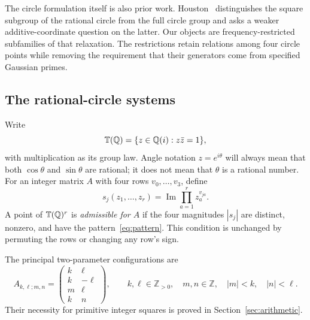 \documentclass[11pt,letterpaper]{article}
\theoremstyle{definition}\newtheorem{definition}[theorem]{Definition}
\theoremstyle{remark}\newtheorem{remark}[theorem]{Remark}
\newcommand{\Q}{\mathbb Q}\newcommand{\Z}{\mathbb Z}\newcommand{\R}{\mathbb R}
\newcommand{\im}{\operatorname{Im}}\newcommand{\Res}{\operatorname{Res}}
\begin{document}
The circle formulation itself is also prior work. Houston~\cite[formulation P4 and question W1]{Houston} distinguishes the square subgroup of the rational circle from the full circle group and asks a weaker additive-coordinate question on the latter. Our objects are frequency-restricted subfamilies of that relaxation. The restrictions retain relations among four circle points while removing the requirement that their generators come from specified Gaussian primes.

\subsection{The rational-circle systems}
Write
\[
 \T(\Q)=\{z\in\Q(i):z\bar z=1\},
\]
with multiplication as its group law. Angle notation $z=e^{i\theta}$ will always mean that both $\cos\theta$ and $\sin\theta$ are rational; it does not mean that $\theta$ is a rational number. For an integer matrix $A$ with four rows $v_0,\ldots,v_3$, define
\[
 s_j(z_1,\ldots,z_r)=\im\prod_{a=1}^r z_a^{v_{ja}}.
\]
A point of $\T(\Q)^r$ is \emph{admissible for $A$} if the four magnitudes $|s_j|$ are distinct, nonzero, and have the pattern~\eqref{eq:pattern}. This condition is unchanged by permuting the rows or changing any row's sign.

The principal two-parameter configurations are
\begin{equation}\label{eq:normalformintro}
 A_{k,\ell;m,n}=
 \begin{pmatrix}k&\ell\\k&-\ell\\m&\ell\\k&n\end{pmatrix},
 \qquad k,\ell\in\Z_{>0},\quad m,n\in\Z,\quad |m|<k,\quad |n|<\ell.
\end{equation}
Their necessity for primitive integer squares is proved in Section~\ref{sec:arithmetic}.
\end{document}
